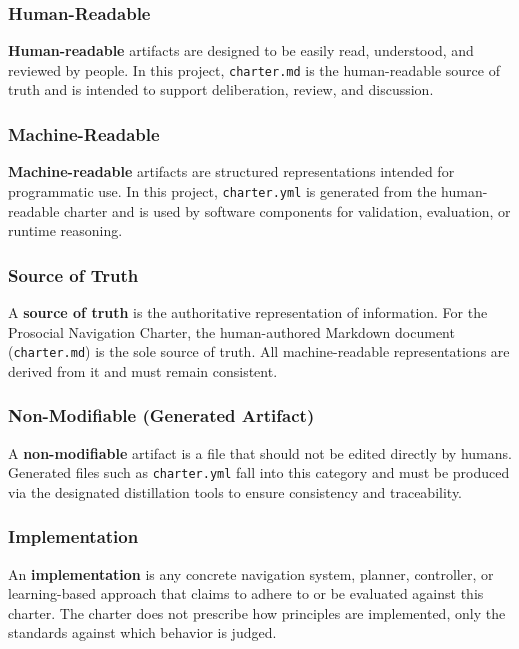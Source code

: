 \documentclass[utf8]{frontiers_suppmat} %
\begin{document}
\subsubsection{Human-Readable}\label{human-readable}

\textbf{Human-readable} artifacts are designed to be easily read,
understood, and reviewed by people. In this project, \texttt{charter.md}
is the human-readable source of truth and is intended to support
deliberation, review, and discussion.

\subsubsection{Machine-Readable}\label{machine-readable}

\textbf{Machine-readable} artifacts are structured representations
intended for programmatic use. In this project, \texttt{charter.yml} is
generated from the human-readable charter and is used by software
components for validation, evaluation, or runtime reasoning.

\subsubsection{Source of Truth}\label{source-of-truth}

A \textbf{source of truth} is the authoritative representation of
information. For the Prosocial Navigation Charter, the human-authored
Markdown document (\texttt{charter.md}) is the sole source of truth. All
machine-readable representations are derived from it and must remain
consistent.

\subsubsection{Non-Modifiable (Generated
Artifact)}\label{non-modifiable-generated-artifact}

A \textbf{non-modifiable} artifact is a file that should not be edited
directly by humans. Generated files such as \texttt{charter.yml} fall
into this category and must be produced via the designated distillation
tools to ensure consistency and traceability.

\subsubsection{Implementation}\label{implementation}

An \textbf{implementation} is any concrete navigation system, planner,
controller, or learning-based approach that claims to adhere to or be
evaluated against this charter. The charter does not prescribe how
principles are implemented, only the standards against which behavior is
judged.
\end{document}
